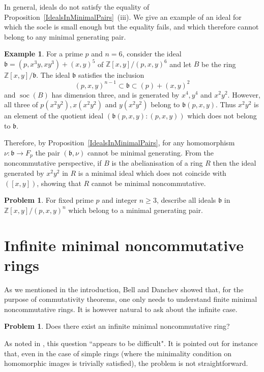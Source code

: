 \documentclass[11pt]{article}
\DeclareMathOperator{\soc}{soc}
\theoremstyle{definition}
\newtheorem{numberedexample}[corollary]{Example}
\newtheorem{problem}[corollary]{Problem}
\begin{document}
In general, ideals do not satisfy the equality of Proposition~\ref{IdealsInMinimalPairs}~(iii). We give an example of an ideal for which the socle is small enough but the equality fails, and which therefore cannot belong to any minimal generating pair.

\begin{numberedexample}
For a prime $p$ and $n=6$, consider the ideal $\mathfrak{b}=(p,x^3y,xy^3)+(x,y)^5$ of $\mathbb{Z}[x,y]/(p,x,y)^6$ and let $B$ be the ring $\mathbb{Z}[x,y]/\mathfrak{b}$. The ideal $\mathfrak{b}$ satisfies the inclusion
\[(p,x,y)^{n-1}\subset\mathfrak{b}\subset(p)+(x,y)^2\]
and $\soc(B)$ has dimension three, and is generated by $x^4,y^4$ and $x^2y^2$. However, all three of $p(x^2y^2), x(x^2y^2)$ and $y(x^2y^2)$ belong to $\mathfrak{b}(p,x,y)$. Thus $x^2y^2$ is an element of the quotient ideal $\left(\mathfrak{b}(p,x,y):(p,x,y)\right)$ which does not belong to $\mathfrak{b}$.

Therefore, by Proposition~\ref{IdealsInMinimalPairs}, for any homomorphism $\nu:\mathfrak{b}\to F_p$ the pair $\left(\mathfrak{b},\nu\right)$ cannot be minimal generating. From the noncommutative perspective, if $B$ is the abelianisation of a ring $R$ then the ideal generated by $x^2y^2$ in $R$ is a minimal ideal which does not coincide with $([x,y])$, showing that $R$ cannot be minimal noncommutative.
\end{numberedexample}

\begin{problem}
For fixed prime $p$ and integer $n\geq 3$, describe all ideals $\mathfrak{b}$ in $\mathbb{Z}[x,y]/(p,x,y)^n$ which belong to a minimal generating pair.
\end{problem}

\section{Infinite minimal noncommutative rings}\label{InfiniteCase}

As we mentioned in the introduction, Bell and Danchev showed that, for the purpose of commutativity theorems, one only needs to understand finite minimal noncommutative rings. It is however natural to ask about the infinite case.

\begin{problem}\label{ProblemInfiniteMinimalNoncommutative}
Does there exist an infinite minimal noncommutative ring?
\end{problem}

As noted in \cite[Remark~2.6]{BellandDanchev}, this question ``appears to be difficult". It is pointed out for instance that, even in the case of simple rings (where the minimality condition on homomorphic images is trivially satisfied), the problem is not straightforward.
\end{document}
